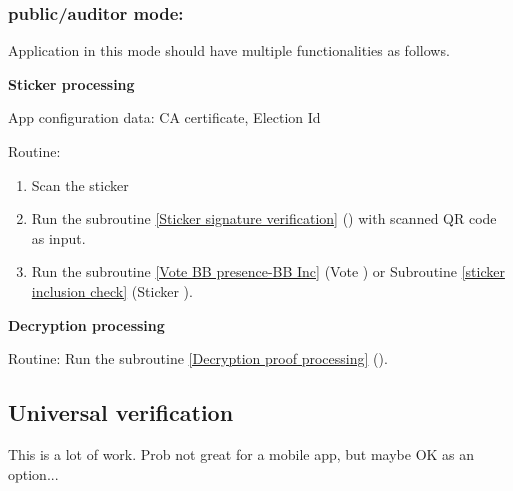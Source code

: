\documentclass{article}
\begin{document}
\subsubsection{\localVotingCenter{}  public/auditor mode:}
Application in this mode should have multiple functionalities as follows.


\textbf{Sticker processing}

App configuration data: CA certificate, Election Id

Routine:
\begin{enumerate}
    \item Scan the sticker
    \item Run the subroutine \ref{Sticker signature verification} (\StickersignatureVerification{}) with scanned QR code as input.
    \item Run the subroutine \ref{Vote BB presence-BB Inc} (Vote \BBInclusionCheck{}) or Subroutine \ref{sticker inclusion check} (Sticker \BBInclusionCheck{}).

\end{enumerate}

\textbf{Decryption processing}

Routine: Run the subroutine \ref{Decryption proof processing} (\DecryptionProof{}).

\subsection{Universal verification}
    This is a lot of work. Prob not great for a mobile app, but maybe OK as an option...
\end{document}
